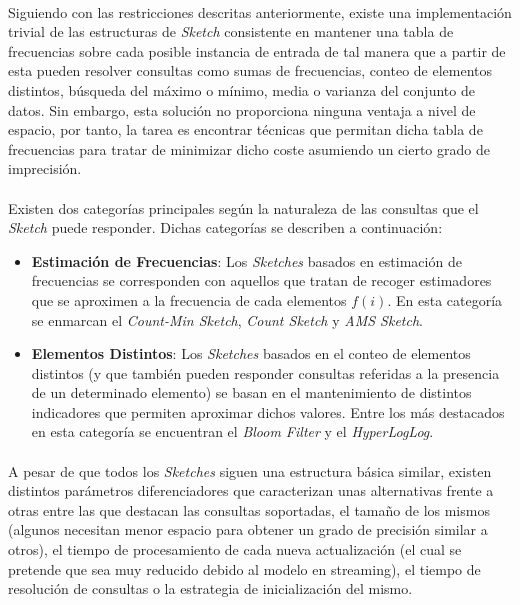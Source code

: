 \documentclass{subfiles}
\begin{document}
        \paragraph{}
        Siguiendo con las restricciones descritas anteriormente, existe una implementación trivial de las estructuras de \emph{Sketch} consistente en mantener una tabla de frecuencias sobre cada posible instancia de entrada de tal manera que a partir de esta pueden resolver consultas como sumas de frecuencias, conteo de elementos distintos, búsqueda del máximo o mínimo, media o varianza del conjunto de datos. Sin embargo, esta solución no proporciona ninguna ventaja a nivel de espacio, por tanto, la tarea es encontrar técnicas que permitan  dicha tabla de frecuencias para tratar de minimizar dicho coste asumiendo un cierto grado de imprecisión.

        \paragraph{}
        Existen dos categorías principales según la naturaleza de las consultas que el \emph{Sketch} puede responder. Dichas categorías se describen a continuación:

        \begin{itemize}

          \item \textbf{Estimación de Frecuencias}: Los \emph{Sketches} basados en estimación de frecuencias se corresponden con aquellos que tratan de recoger estimadores que se aproximen a la frecuencia de cada elementos $f(i)$. En esta categoría se enmarcan el \emph{Count-Min Sketch}, \emph{Count Sketch} y  \emph{AMS Sketch}.

          \item \textbf{Elementos Distintos}: Los \emph{Sketches} basados en el conteo de elementos distintos (y que también pueden responder consultas referidas a la presencia de un determinado elemento) se basan en el mantenimiento de distintos indicadores que permiten aproximar dichos valores. Entre los más destacados en esta categoría se encuentran el \emph{Bloom Filter} y el \emph{HyperLogLog}.

        \end{itemize}

        \paragraph{}
        A pesar de que todos los \emph{Sketches} siguen una estructura básica similar, existen distintos parámetros diferenciadores que caracterizan unas alternativas frente a otras entre las que destacan las consultas soportadas, el tamaño de los mismos (algunos necesitan menor espacio para obtener un grado de precisión similar a otros), el tiempo de procesamiento de cada nueva actualización (el cual se pretende que sea muy reducido debido al modelo en streaming), el tiempo de resolución de consultas o la estrategia de inicialización del mismo.
\end{document}
